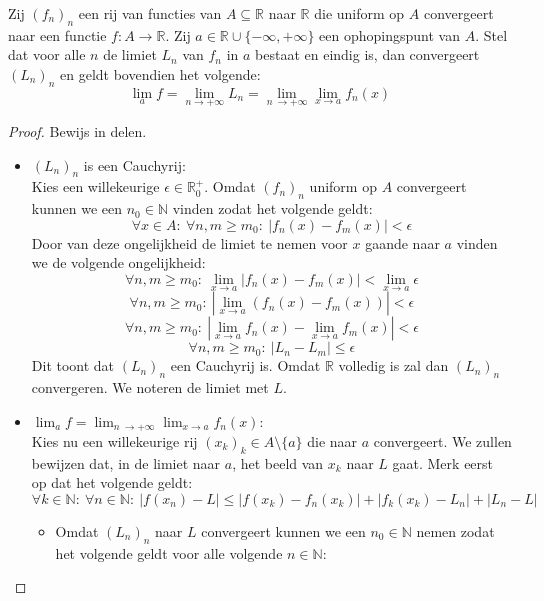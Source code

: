 \documentclass[main.tex]{subfiles}
\begin{document}
\begin{bst}
  Zij $(f_{n})_{n}$ een rij van functies van $A \subseteq \mathbb{R}$ naar $\mathbb{R}$ die uniform op $A$ convergeert naar een functie $f: A \rightarrow \mathbb{R}$.
  Zij $a\in \mathbb{R} \cup \{-\infty,+\infty\}$ een ophopingspunt van $A$.
  Stel dat voor alle $n$ de limiet $L_{n}$ van $f_{n}$ in $a$ bestaat en eindig is, dan convergeert $(L_{n})_{n}$ en geldt bovendien het volgende:
  \[ \lim_{a}f = \lim_{n \rightarrow +\infty} L_{n} = \lim_{n\ \rightarrow +\infty} \lim_{x \rightarrow a} f_{n}(x) \]

  \begin{proof}
    Bewijs in delen.
    \begin{itemize}
    \item $(L_{n})_{n}$ is een Cauchyrij:\\
      Kies een willekeurige $\epsilon \in \mathbb{R}_{0}^{+}$.
      Omdat $(f_{n})_{n}$ uniform op $A$ convergeert kunnen we een $n_{0}\in \mathbb{N}$ vinden zodat het volgende geldt:
      \[ \forall x\in A:\ \forall n,m \ge m_{0}:\ |f_{n}(x) -f_{m}(x)| < \epsilon \]
      Door van deze ongelijkheid de limiet te nemen voor $x$ gaande naar $a$ vinden we de volgende ongelijkheid:
      \[ \forall n,m \ge m_{0}:\ \lim_{x \rightarrow a}|f_{n}(x) -f_{m}(x)| < \lim_{x \rightarrow a}\epsilon\]
      \[ \forall n,m \ge m_{0}:\ |\lim_{x \rightarrow a}\left(f_{n}(x) -f_{m}(x)\right)| < \epsilon\]
      \[ \forall n,m \ge m_{0}:\ |\lim_{x \rightarrow a}f_{n}(x) -\lim_{x \rightarrow a}f_{m}(x)| < \epsilon\]
      \[ \forall n,m \ge m_{0}:\ |L_{n}-L_{m}| \le \epsilon \]
      Dit toont dat $(L_{n})_{n}$ een Cauchyrij is.
      Omdat $\mathbb{R}$ volledig is zal dan $(L_{n})_{n}$ convergeren.
      We noteren de limiet met $L$.
    \item $\lim_{a}f =  \lim_{n\ \rightarrow +\infty} \lim_{x \rightarrow a} f_{n}(x)$:\\
      Kies nu een willekeurige rij $(x_{k})_{k} \in A\setminus \{a\}$ die naar $a$ convergeert.
      We zullen bewijzen dat, in de limiet naar $a$, het beeld van $x_{k}$ naar $L$ gaat.
      Merk eerst op dat het volgende geldt:
      \[ \forall k\in \mathbb{N}:\ \forall n\in \mathbb{N}:\ |f(x_{n})-L| \le |f(x_{k}) -f_{n}(x_{k})| + |f_{k}(x_{k})-L_{n}| + |L_{n}-L| \]
      \begin{itemize}
      \item 
        Omdat $(L_{n})_{n}$ naar $L$ convergeert kunnen we een $n_{0}\in\mathbb{N}$ nemen zodat het volgende geldt voor alle volgende $n\in \mathbb{N}$:

\end{itemize}
\end{itemize}
\end{proof}
\end{bst}
\end{document}
